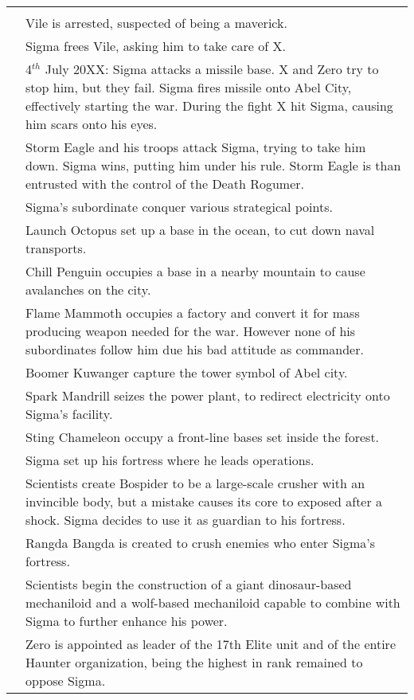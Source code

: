 \begin{tabularx}{\linewidth}{l X}
	\midrule
	\rowcolor{Aquamarine}
	\multicolumn{2}{c}{\textbf{Day of $\Sigma$ and beginning of the war}}\\
	\addlinespace[1.5ex]
	\tabdot& Vile is arrested, suspected of being a maverick.\\
	\tabdot& Sigma frees Vile, asking him to take care of X.\\
	\tabdot& 4$^{th}$ July 20XX: Sigma attacks a missile base. X and Zero try to stop him, but they fail. Sigma fires missile onto Abel City, effectively starting the war. During the fight X hit Sigma, causing him scars onto his eyes.\\
	\tabdot& Storm Eagle and his troops attack Sigma, trying to take him down. Sigma wins, putting him under his rule. Storm Eagle is than entrusted with the control of the Death Rogumer.\\
	\tabdot& Sigma's subordinate conquer various strategical points.\\
	\tabline& Launch Octopus set up a base in the ocean, to cut down naval transports.\\
	\tabline& Chill Penguin occupies a base in a nearby mountain to cause avalanches on the city.\\
	\tabline& Flame Mammoth occupies a factory and convert it for mass producing weapon needed for the war. However none of his subordinates follow him due his bad attitude as commander.\\
	\tabline& Boomer Kuwanger capture the tower symbol of Abel city.\\
	\tabline& Spark Mandrill seizes the power plant, to redirect electricity onto Sigma's facility.\\
	\tabline& Sting Chameleon occupy a front-line bases set inside the forest.\\
	\tabdot& Sigma set up his fortress where he leads operations.\\
	\tabline& Scientists create Bospider to be a large-scale crusher with an invincible body, but a mistake causes its core to exposed after a shock. Sigma decides to use it as guardian to his fortress.\\
	\tabline& Rangda Bangda is created to crush enemies who enter Sigma's fortress.\\
	\tabline& Scientists begin the construction of a giant dinosaur-based mechaniloid and a wolf-based mechaniloid capable to combine with Sigma to further enhance his power.\\
	\tabdot& Zero is appointed as leader of the 17th Elite unit and of the entire Haunter organization, being the highest in rank remained to oppose Sigma.\\

\end{tabularx}
